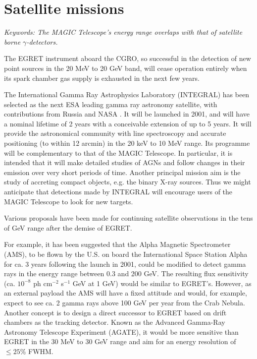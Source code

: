 \section{Satellite missions}

{\it Keywords: The MAGIC Telescope's energy range 
overlaps with that of satellite borne $\gamma$-detectors.}

\par\medskip
The EGRET instrument aboard the CGRO, so successful in the detection of new
point sources in the 20 MeV to 20 GeV band, will cease operation entirely
when its spark chamber gas supply is exhausted in the next few years.

The International Gamma Ray Astrophysics Laboratory (INTEGRAL) has been
selected as the next ESA leading gamma ray astronomy satellite, with
contributions from Russia and NASA \cite{integral:97}. It will be launched in
2001, and will have a nominal lifetime of 2 years with a conceivable
extension of up to 5 years. It will provide the astronomical community with
line spectroscopy and accurate positioning (to within 12 arcmin) in the 20
keV to 10 MeV range. Its programme will be complementary to that of the
MAGIC Telescope. In particular, it is intended that it will make detailed
studies of AGNs and follow changes in their emission over very short periods
of time. Another principal mission aim is the study of accreting compact
objects, e.g. the binary X-ray sources. Thus we might anticipate that
detections made by INTEGRAL will encourage users of the MAGIC Telescope to
look for new targets.

Various proposals have been made for continuing satellite observations in
the tens of GeV range after the demise of EGRET.

For example, it has been suggested that the Alpha Magnetic Spectrometer
(AMS), to be flown by the U.S. on board the International Space Station
Alpha for ca. 3 years following the launch in 2001, could be modified to
detect gamma rays in the energy range between 0.3 and 200 GeV. The resulting
flux sensitivity (ca. $10^{-8}$ ph cm$^{-2}$ s$^{-1}$ GeV at 1 GeV) would be
similar to EGRET's. However, as an external payload the AMS will have a
fixed attitude and would, for example, expect to see ca. 2 gamma rays above
100 GeV per year from the Crab Nebula. Another concept is to
design a direct successor to EGRET based on drift chambers as the tracking
detector. Known as the Advanced Gamma-Ray Astronomy Telescope Experiment
(AGATE), it would be more sensitive than EGRET in the 30 MeV to 30 GeV range
and aim for an energy resolution of $\leq 25\%$ FWHM.

